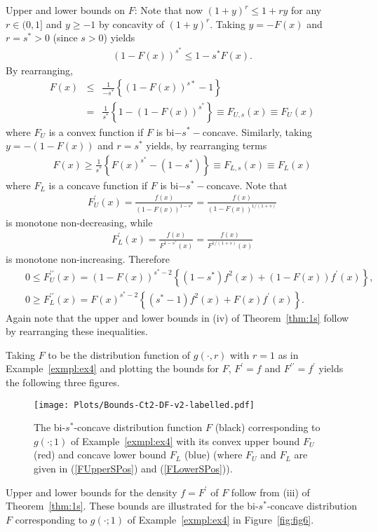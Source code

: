 \documentclass[11pt]{amsart}
\numberwithin{equation}{section}
\theoremstyle{definition}\newtheorem{definition}{Definition}
\theoremstyle{remark}\newtheorem{assumption}{Assumption}
\theoremstyle{remark}\newtheorem{remark}{Remark}
\theoremstyle{definition}\newtheorem{example}{Example}
\theoremstyle{plain}\newtheorem{question}{Question}
\theoremstyle{plain}\newtheorem{theorem}{Theorem}
\theoremstyle{plain}\newtheorem{lemma}{Lemma}
\theoremstyle{plain}\newtheorem{proposition}{Proposition}
\theoremstyle{plain}\newtheorem{corollary}{Corollary}
\theoremstyle{plain}\newtheorem{conjecture}{Conjecture}
\begin{document}
Upper and lower bounds on $F$:   Note that now $(1+y)^r \le 1+ ry$ for any $r \in (0,1]$ and $y \ge -1$ 
by concavity of $(1+y)^r$.
Taking $y = -F(x)$ and $r = s^*>0$  (since $s>0$) yields 
\begin{eqnarray*}
(1-F(x))^{s^*} \le 1- s^* F(x) . 
\end{eqnarray*}
By rearranging,
\begin{eqnarray}
F(x) & \le & \frac{1}{-s^*} \left \{ (1-F(x))^{s*} - 1 \right \} \nonumber \\
& = & \frac{1}{s^*} \left \{ 1- (1-F(x))^{s^*} \right \} \equiv F_{U,s} (x) \equiv F_U (x)
\label{FUpperSPos}
\end{eqnarray}
where $F_U$ is a convex function if $F$ is bi$-s^*-$concave.  
Similarly, taking $y= - (1-F(x))$ and $r=s^*$ yields, by rearranging terms
\begin{eqnarray}
F(x) \ge \frac{1}{s^*} \left \{ F(x)^{s^*} - (1-s^*) \right \} \equiv F_{L,s} (x) \equiv F_L (x) 
\label{FLowerSPos}
\end{eqnarray}
where $F_L$ is a concave function if $F$ is bi$-s^*-$concave.  
Note that 
\begin{eqnarray}
F_U^{\prime} (x) =  \frac{f(x)}{(1-F(x))^{1-s^*}}  = \frac{f(x)}{(1-F(x))^{1/(1+s)}} 
\label{FprimeUpperSPos}
\end{eqnarray}
is monotone non-decreasing, while
\begin{eqnarray}
F_L^{\prime} (x)  =  \frac{f(x)}{F^{1-s^*}(x)}  = \frac{f(x)}{F^{1/(1+s)} (x)}  
\label{FprimeLowerSPos}
\end{eqnarray}
is monotone non-increasing.  
  Therefore
\begin{eqnarray*}
&& 0 \le F_U^{\prime \prime} (x) =  (1-F(x))^{s^*-2} \left \{ (1-s^*) f^2 (x) + (1-F(x)) f^{\prime} (x) \right \}, \\
&& 0\ge F_L^{\prime \prime} (x)  =   F(x)^{s^*-2} \left \{ (s^*-1) f^2 (x) + F(x) f^{\prime}(x) \right \} . 
\end{eqnarray*}
Again note that the upper and lower bounds in (iv) of Theorem~\ref{thm:1s} follow by rearranging these inequalities. 

Taking $F$ to be the distribution function of  $g(\cdot, r)$ with $r=1$ as in 
Example~\ref{exmpl:ex4} and plotting the bounds  for $F$, $F^{\prime} = f$ 
and $F^{\prime \prime} = f^{\prime}$ yields the following three figures.  

\begin{figure}[ht]
    \centering
    \texttt{[image: Plots/Bounds-Ct2-DF-v2-labelled.pdf]}
    \caption{The bi-$s^*$-concave distribution function $F$ (black) corresponding to $g(\cdot; 1)$ of Example~\ref{exmpl:ex4}
    with its convex upper bound $F_U$ (red) and concave lower bound $F_L$ (blue)
    (where $F_U$ and $F_L$ are given in (\ref{FUpperSPos}) and (\ref{FLowerSPos})).}
     \label{fig:fig5}
 \end{figure}
Upper and lower bounds for the density $f = F^{\prime} $ of $F$ follow from (iii)  of Theorem~\ref{thm:1s}.
These bounds are illustrated for the bi-$s^*$-concave distribution $F$ 
corresponding to $g(\cdot; 1)$ of Example~\ref{exmpl:ex4}
in Figure~\ref{fig:fig6}.
 
\end{document}
